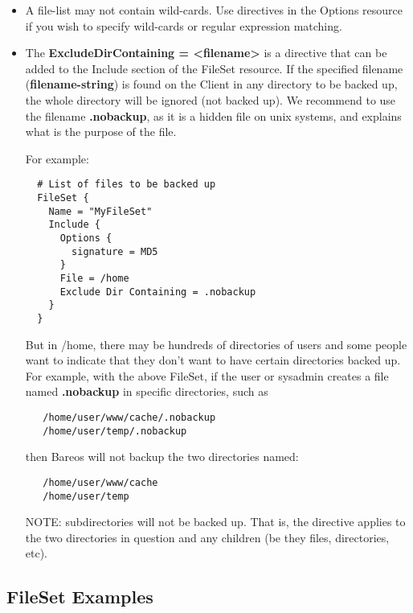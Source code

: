 \begin{itemize}
\item A file-list may not contain wild-cards. Use directives in the
   Options resource if you wish to specify wild-cards or regular expression
   matching.

\item
{}
The {\bf ExcludeDirContaining = {\textless}filename{\textgreater}} is a directive that
can be added to the Include section of the FileSet resource.  If the specified
filename ({\bf filename-string}) is found on the Client in any directory to be
backed up, the whole directory will be ignored (not backed up).
We recommend to use the filename {\bf .nobackup}, as it is a hidden file on unix
systems, and explains what is the purpose of the file.

For example:

\begin{verbatim}
  # List of files to be backed up
  FileSet {
    Name = "MyFileSet"
    Include {
      Options {
        signature = MD5
      }
      File = /home
      Exclude Dir Containing = .nobackup
    }
  }
\end{verbatim}

But in /home, there may be hundreds of directories of users and some
people want to indicate that they don't want to have certain
directories backed up. For example, with the above FileSet, if
the user or sysadmin creates a file named {\bf .nobackup} in
specific directories, such as

\begin{verbatim}
   /home/user/www/cache/.nobackup
   /home/user/temp/.nobackup
\end{verbatim}

then Bareos will not backup the two directories named:

\begin{verbatim}
   /home/user/www/cache
   /home/user/temp
\end{verbatim}

NOTE: subdirectories will not be backed up.  That is, the directive
applies to the two directories in question and any children (be they
files, directories, etc).

\end{itemize}

\subsection{FileSet Examples}

